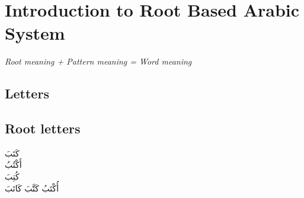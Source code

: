 \chapter{Introduction to Root Based Arabic System}


\textit{Root meaning + Pattern meaning = Word meaning}
\section{Letters}
\section{Root letters}
\textarabic{كَتَبَ} \\
\textarabic{أَكْتُبُ} \\
\textarabic{كُتِبَ} \\
\textarabic{أُكْتَبُ} 
\textarabic{كَتَّبَ}
\textarabic{كَاتَبَ}

